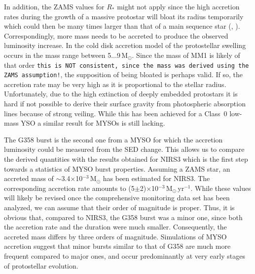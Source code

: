 \documentclass[longauth,usenatbib]{aa}
\begin{document}
In addition, the ZAMS values for $R_*$ might not apply since the high accretion rates during the growth of a massive protostar will bloat its radius temporarily which could then be many times larger than that of a main sequence star (, ). Correspondingly, more mass needs to be accreted to produce the observed luminosity increase. 
In the cold disk accretion model of  the protostellar swelling occurs in the mass range between 5$\dots$9\,M$_\odot$. Since the mass of MM1 is likely of that order {\tt this is NOT consistent, since the mass was derived using the ZAMS assumption!}, the supposition of being bloated is perhaps valid. If so, the accretion rate may be very high as it is proportional to the stellar radius. Unfortunately, due to the high extinction of deeply embedded protostars it is hard if not possible to derive their surface gravity from photospheric absorption lines because of strong veiling. While this has been achieved for a Class~0 low-mass YSO  a similar result for MYSOs is still lacking.

The G358 burst is the second one from a MYSO for which the accretion luminosity could be measured from the SED change. This allows us to compare the derived quantities with the results obtained for NIRS3  which is the first step towards a statistics of MYSO burst properties. 
Assuming a ZAMS star, an accreted mass of $\sim$3.4$\times$10$^{-3}$\,M$_\odot$ has been estimated for NIRS3. The corresponding accretion rate amounts to
(5$\pm$2)$\times$10$^{-3}$\,M$_\odot$\,yr$^{-1}$. While these values will likely be revised once the comprehensive monitoring data set has been analyzed, we can assume that their order of magnitude is proper. Thus, it is obvious that, compared to NIRS3, the G358 burst was a minor one, since both the accretion rate and the duration were much smaller. Consequently, the accreted mass differs by three orders of magnitude. Simulations of MYSO accretion  suggest that minor bursts similar to that of G358 are much more frequent compared to major ones, and occur predominantly at very early stages of protostellar evolution.
\end{document}

